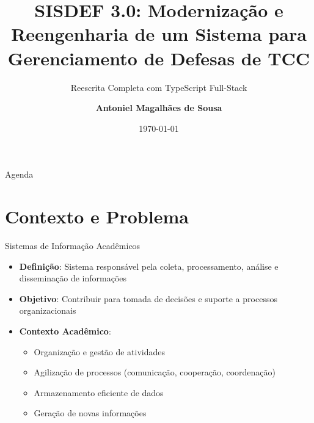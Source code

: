 \documentclass[aspectratio=169,xcolor=table]{beamer}
\author[Magalhães, Antoniel]{%
  \textbf{Antoniel Magalhães de Sousa}
}
\title{SISDEF 3.0: Modernização e Reengenharia de um Sistema para Gerenciamento de Defesas de TCC}
\subtitle{Reescrita Completa com TypeScript Full-Stack}
\institute{Universidade Federal da Bahia \\ Instituto de Computação}
\date{\today}
\begin{document}
\begin{frame}
    \titlepage
    
\end{frame}

\begin{frame}{Agenda}
    \tableofcontents
\end{frame}

\setlength{\parskip}{1em}

\section{Contexto e Problema}

\begin{frame}{Sistemas de Informação Acadêmicos}
    \begin{itemize}
        \item \textbf{Definição}: Sistema responsável pela coleta, processamento, análise e disseminação de informações
        \item \textbf{Objetivo}: Contribuir para tomada de decisões e suporte a processos organizacionais
        \item \textbf{Contexto Acadêmico}:
        \begin{itemize}
            \item Organização e gestão de atividades
            \item Agilização de processos (comunicação, cooperação, coordenação)
            \item Armazenamento eficiente de dados
            \item Geração de novas informações
        \end{itemize}
    \end{itemize}
\end{frame}
\end{document}
